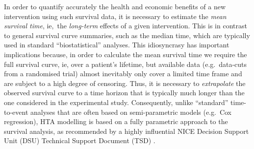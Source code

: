 \documentclass[AMA,STIX1COL]{WileyNJD-v2}
\begin{document}
In order to quantify accurately the health and economic benefits of a new intervention using such survival data, it is necessary to estimate the {\it mean survival time}, ie,~the \textit{long-term} effects of a given intervention.
This is in contrast to general survival curve summaries, such as the median time, which are typically used in standard ``biostatistical'' analyses.
This idiosyncrasy has important implications because, in order to calculate the mean survival time we require the full survival curve, ie, over a patient's lifetime, but available data (e.g.~data-cuts from a randomised trial) almost inevitably only cover a limited time frame and are subject to a high degree of censoring.
Thus, it is necessary to \textit{extrapolate} the observed survival curve to a time horizon that is typically much longer than the one considered in the experimental study.
Consequently, unlike ``standard'' time-to-event analyses that are often based on semi-parametric models (e.g.~Cox regression), HTA modelling is based on a fully parametric approach to the survival analysis, as recommended by a highly influential NICE Decision Support Unit (DSU) Technical Support Document (TSD) \citep{Latimer2011}.
\end{document}
